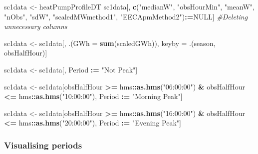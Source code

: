 \documentclass[]{article}
\newenvironment{Shaded}{\begin{snugshade}}{\end{snugshade}}
\newcommand{\KeywordTok}[1]{\textcolor[rgb]{0.13,0.29,0.53}{\textbf{#1}}}
\newcommand{\DataTypeTok}[1]{\textcolor[rgb]{0.13,0.29,0.53}{#1}}
\newcommand{\StringTok}[1]{\textcolor[rgb]{0.31,0.60,0.02}{#1}}
\newcommand{\CommentTok}[1]{\textcolor[rgb]{0.56,0.35,0.01}{\textit{#1}}}
\newcommand{\OtherTok}[1]{\textcolor[rgb]{0.56,0.35,0.01}{#1}}
\newcommand{\OperatorTok}[1]{\textcolor[rgb]{0.81,0.36,0.00}{\textbf{#1}}}
\newcommand{\ErrorTok}[1]{\textcolor[rgb]{0.64,0.00,0.00}{\textbf{#1}}}
\newcommand{\NormalTok}[1]{#1}
\theoremstyle{definition}
\theoremstyle{definition}
\theoremstyle{definition}
\theoremstyle{remark}
\begin{document}
\begin{Shaded}
\begin{Highlighting}[]
\NormalTok{sc1data <-}\StringTok{ }\NormalTok{heatPumpProfileDT}
\NormalTok{sc1data[, }\KeywordTok{c}\NormalTok{(}\StringTok{"medianW"}\NormalTok{, }\StringTok{"obsHourMin"}\NormalTok{, }\StringTok{"meanW"}\NormalTok{, }\StringTok{"nObs"}\NormalTok{, }\StringTok{"sdW"}\NormalTok{,}
            \StringTok{"scaledMWmethod1"}\NormalTok{, }\StringTok{"EECApmMethod2"}\NormalTok{)}\OperatorTok{:}\ErrorTok{=}\OtherTok{NULL}\NormalTok{] }\CommentTok{#Deleting unnecessary columns}

\NormalTok{sc1data <-}\StringTok{ }\NormalTok{sc1data[, .(}\DataTypeTok{GWh =} \KeywordTok{sum}\NormalTok{(scaledGWh)), }
\NormalTok{                    keyby =}\StringTok{ }\NormalTok{.(season, obsHalfHour)]}

\NormalTok{sc1data <-}\StringTok{ }\NormalTok{sc1data[, Period }\OperatorTok{:}\ErrorTok{=}\StringTok{ "Not Peak"}\NormalTok{]}

\NormalTok{sc1data <-}\StringTok{ }\NormalTok{sc1data[obsHalfHour }\OperatorTok{>=}\StringTok{ }\NormalTok{hms}\OperatorTok{::}\KeywordTok{as.hms}\NormalTok{(}\StringTok{"06:00:00"}\NormalTok{) }\OperatorTok{&}\StringTok{ }
\StringTok{                     }\NormalTok{obsHalfHour }\OperatorTok{<=}\StringTok{ }\NormalTok{hms}\OperatorTok{::}\KeywordTok{as.hms}\NormalTok{(}\StringTok{"10:00:00"}\NormalTok{),}
\NormalTok{                   Period }\OperatorTok{:}\ErrorTok{=}\StringTok{ "Morning Peak"}\NormalTok{]}

\NormalTok{sc1data <-}\StringTok{ }\NormalTok{sc1data[obsHalfHour }\OperatorTok{>=}\StringTok{ }\NormalTok{hms}\OperatorTok{::}\KeywordTok{as.hms}\NormalTok{(}\StringTok{"16:00:00"}\NormalTok{) }\OperatorTok{&}\StringTok{ }
\StringTok{                     }\NormalTok{obsHalfHour }\OperatorTok{<=}\StringTok{ }\NormalTok{hms}\OperatorTok{::}\KeywordTok{as.hms}\NormalTok{(}\StringTok{"20:00:00"}\NormalTok{),}
\NormalTok{                   Period }\OperatorTok{:}\ErrorTok{=}\StringTok{ "Evening Peak"}\NormalTok{]}
\end{Highlighting}
\end{Shaded}

\subsubsection{Visualising periods}\label{visualising-periods}
\end{document}
